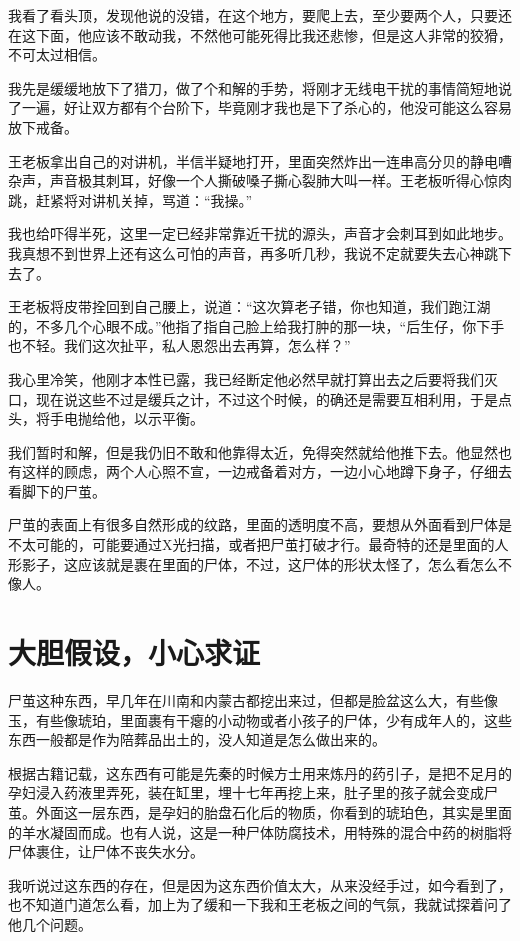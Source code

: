 我看了看头顶，发现他说的没错，在这个地方，要爬上去，至少要两个人，只要还在这下面，他应该不敢动我，不然他可能死得比我还悲惨，但是这人非常的狡猾，不可太过相信。

我先是缓缓地放下了猎刀，做了个和解的手势，将刚才无线电干扰的事情简短地说了一遍，好让双方都有个台阶下，毕竟刚才我也是下了杀心的，他没可能这么容易放下戒备。

王老板拿出自己的对讲机，半信半疑地打开，里面突然炸出一连串高分贝的静电嘈杂声，声音极其刺耳，好像一个人撕破嗓子撕心裂肺大叫一样。王老板听得心惊肉跳，赶紧将对讲机关掉，骂道：“我操。”

我也给吓得半死，这里一定已经非常靠近干扰的源头，声音才会刺耳到如此地步。我真想不到世界上还有这么可怕的声音，再多听几秒，我说不定就要失去心神跳下去了。

王老板将皮带拴回到自己腰上，说道：“这次算老子错，你也知道，我们跑江湖的，不多几个心眼不成。”他指了指自己脸上给我打肿的那一块，“后生仔，你下手也不轻。我们这次扯平，私人恩怨出去再算，怎么样？”

我心里冷笑，他刚才本性已露，我已经断定他必然早就打算出去之后要将我们灭口，现在说这些不过是缓兵之计，不过这个时候，的确还是需要互相利用，于是点头，将手电抛给他，以示平衡。

我们暂时和解，但是我仍旧不敢和他靠得太近，免得突然就给他推下去。他显然也有这样的顾虑，两个人心照不宣，一边戒备着对方，一边小心地蹲下身子，仔细去看脚下的尸茧。

尸茧的表面上有很多自然形成的纹路，里面的透明度不高，要想从外面看到尸体是不太可能的，可能要通过X光扫描，或者把尸茧打破才行。最奇特的还是里面的人形影子，这应该就是裹在里面的尸体，不过，这尸体的形状太怪了，怎么看怎么不像人。

\chapter{大胆假设，小心求证}

尸茧这种东西，早几年在川南和内蒙古都挖出来过，但都是脸盆这么大，有些像玉，有些像琥珀，里面裹有干瘪的小动物或者小孩子的尸体，少有成年人的，这些东西一般都是作为陪葬品出土的，没人知道是怎么做出来的。

根据古籍记载，这东西有可能是先秦的时候方士用来炼丹的药引子，是把不足月的孕妇浸入药液里弄死，装在缸里，埋十七年再挖上来，肚子里的孩子就会变成尸茧。外面这一层东西，是孕妇的胎盘石化后的物质，你看到的琥珀色，其实是里面的羊水凝固而成。也有人说，这是一种尸体防腐技术，用特殊的混合中药的树脂将尸体裹住，让尸体不丧失水分。

我听说过这东西的存在，但是因为这东西价值太大，从来没经手过，如今看到了，也不知道门道怎么看，加上为了缓和一下我和王老板之间的气氛，我就试探着问了他几个问题。


